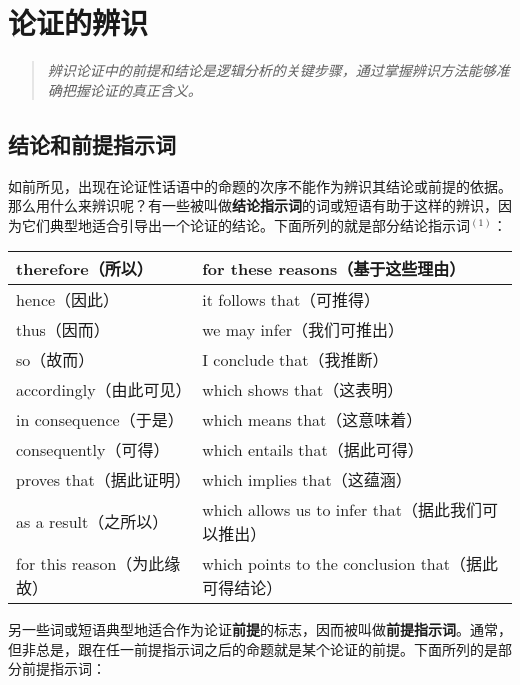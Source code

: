 \section{论证的辨识}

\begin{quotation}
\textit{辨识论证中的前提和结论是逻辑分析的关键步骤，通过掌握辨识方法能够准确把握论证的真正含义。}
\end{quotation}

\subsection{结论和前提指示词}

如前所见，出现在论证性话语中的命题的次序不能作为辨识其结论或前提的依据。那么用什么来辨识呢？有一些被叫做\textbf{结论指示词}的词或短语有助于这样的辨识，因为它们典型地适合引导出一个论证的结论。下面所列的就是部分结论指示词${}^{(1)}$：

\begin{center}
\begin{tabular}{|l|l|}
\hline
therefore（所以） & for these reasons（基于这些理由） \\
\hline
hence（因此） & it follows that（可推得） \\
\hline
thus（因而） & we may infer（我们可推出） \\
\hline
so（故而） & I conclude that（我推断） \\
\hline
accordingly（由此可见） & which shows that（这表明） \\
\hline
in consequence（于是） & which means that（这意味着） \\
\hline
consequently（可得） & which entails that（据此可得） \\
\hline
proves that（据此证明） & which implies that（这蕴涵） \\
\hline
as a result（之所以） & which allows us to infer that（据此我们可以推出） \\
\hline
for this reason（为此缘故） & which points to the conclusion that（据此可得结论） \\
\hline
\end{tabular}
\end{center}

另一些词或短语典型地适合作为论证\textbf{前提}的标志，因而被叫做\textbf{前提指示词}。通常，但非总是，跟在任一前提指示词之后的命题就是某个论证的前提。下面所列的是部分前提指示词：

